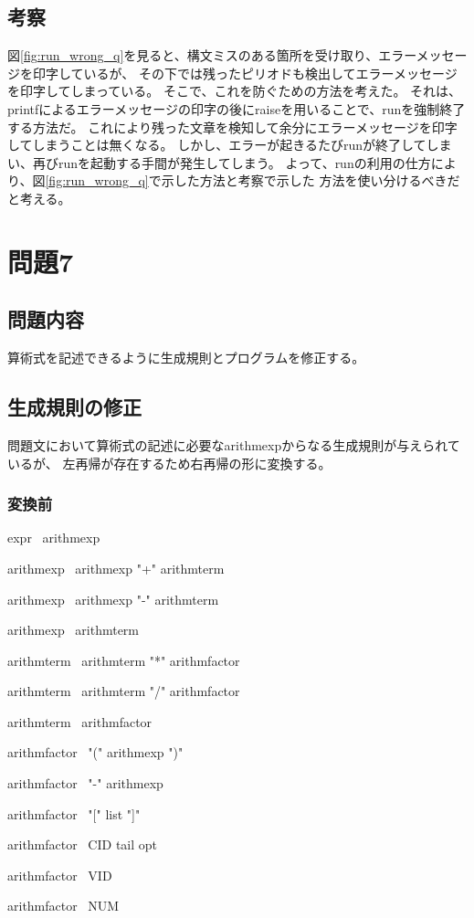 \documentclass{ltjsarticle}
\begin{document}
\subsection{考察}
図\ref{fig:run_wrong_q}を見ると、構文ミスのある箇所を受け取り、エラーメッセージを印字しているが、
その下では残ったピリオドも検出してエラーメッセージを印字してしまっている。
そこで、これを防ぐための方法を考えた。
それは、printfによるエラーメッセージの印字の後にraiseを用いることで、runを強制終了する方法だ。
これにより残った文章を検知して余分にエラーメッセージを印字してしまうことは無くなる。
しかし、エラーが起きるたびrunが終了してしまい、再びrunを起動する手間が発生してしまう。
よって、runの利用の仕方により、図\ref{fig:run_wrong_q}で示した方法と考察で示した
方法を使い分けるべきだと考える。

\section{問題7}
\subsection{問題内容}
算術式を記述できるように生成規則とプログラムを修正する。
\subsection{生成規則の修正}
問題文において算術式の記述に必要なarithmexpからなる生成規則が与えられているが、
左再帰が存在するため右再帰の形に変換する。
\subsubsection{変換前}
expr \rightarrow \  arithmexp\par
arithmexp \rightarrow \  arithmexp "+" arithmterm\par
arithmexp \rightarrow \  arithmexp "-" arithmterm\par
arithmexp \rightarrow \  arithmterm\par
arithmterm \rightarrow \  arithmterm "*" arithmfactor\par
arithmterm \rightarrow \  arithmterm "/" arithmfactor\par
arithmterm \rightarrow \  arithmfactor\par
arithmfactor \rightarrow \  "(" arithmexp ")"\par
arithmfactor \rightarrow \  "-" arithmexp\par
arithmfactor \rightarrow \  "[" list "]"\par
arithmfactor \rightarrow \  CID tail opt\par
arithmfactor \rightarrow \  VID\par
arithmfactor \rightarrow \  NUM\par
\end{document}
